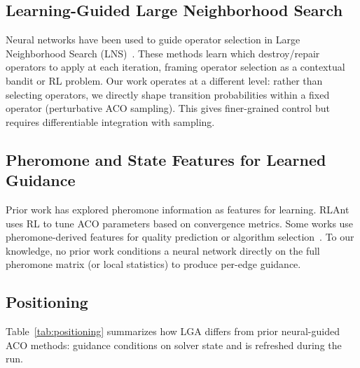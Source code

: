 \documentclass[sigconf,anonymous,review]{acmart}
\theoremstyle{definition}
\theoremstyle{plain}
\newcommand{\LGA}{\textsc{LGA}}
\begin{document}
\subsection{Learning-Guided Large Neighborhood Search}
Neural networks have been used to guide operator selection in Large Neighborhood Search (LNS)~\cite{hottung2019neural,chen2019learning}.
These methods learn which destroy/repair operators to apply at each iteration, framing operator selection as a contextual bandit or RL problem.
Our work operates at a different level: rather than selecting operators, we directly shape transition probabilities within a fixed operator (perturbative ACO sampling).
This gives finer-grained control but requires differentiable integration with sampling.

\subsection{Pheromone and State Features for Learned Guidance}
Prior work has explored pheromone information as features for learning.
RLAnt~\cite{rlant} uses RL to tune ACO parameters based on convergence metrics.
Some works use pheromone-derived features for quality prediction or algorithm selection~\cite{smith-miles2014landscape}.
To our knowledge, no prior work conditions a neural network directly on the full pheromone matrix (or local statistics) to produce per-edge guidance.

\subsection{Positioning}
Table~\ref{tab:positioning} summarizes how \LGA{} differs from prior neural-guided ACO methods: guidance conditions on solver state and is refreshed during the run.

\begin{table}[t]
\centering
\caption{Positioning of neural-guided ACO methods. \LGA{} builds on perturbation-based ACO~\cite{faco} as backend.}
\label{tab:positioning}
\end{table}
\end{document}
